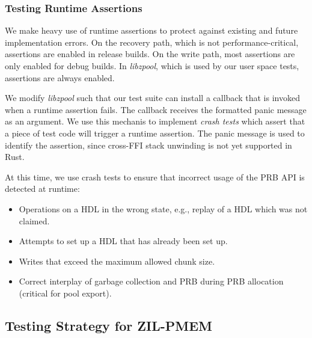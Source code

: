 \documentclass[12pt,a4paper,twoside]{book}
\begin{document}
\subsubsection{Testing Runtime Assertions}
We make heavy use of runtime assertions to protect against existing and future implementation errors.
On the recovery path, which is not performance-critical, assertions are enabled in release builds.
On the write path, most assertions are only enabled for debug builds.
In \textit{libzpool}, which is used by our user space tests, assertions are always enabled.

We modify \textit{libzpool} such that our test suite can install a callback that is invoked when a runtime assertion fails.
The callback receives the formatted panic message as an argument.
We use this mechanis to implement \textit{crash tests} which assert that a piece of test code will trigger a runtime assertion.
The panic message is used to identify the assertion, since cross-FFI stack unwinding is not yet supported in Rust.

At this time, we use crash tests to ensure that incorrect usage of the PRB API is detected at runtime:
\begin{itemize}[noitemsep]
    \item Operations on a HDL in the wrong state, e.g., replay of a HDL which was not claimed.
    \item Attempts to set up a HDL that has already been set up.
    \item Writes that exceed the maximum allowed chunk size.
    \item Correct interplay of garbage collection and PRB during PRB allocation (critical for pool export).
\end{itemize}

\subsection{Testing Strategy for ZIL-PMEM}
\end{document}

